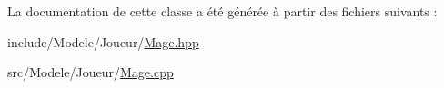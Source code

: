 La documentation de cette classe a été générée à partir des fichiers suivants \-:\begin{DoxyCompactItemize}
\item 
include/\-Modele/\-Joueur/\hyperlink{_mage_8hpp}{Mage.\-hpp}\item 
src/\-Modele/\-Joueur/\hyperlink{_mage_8cpp}{Mage.\-cpp}\end{DoxyCompactItemize}
